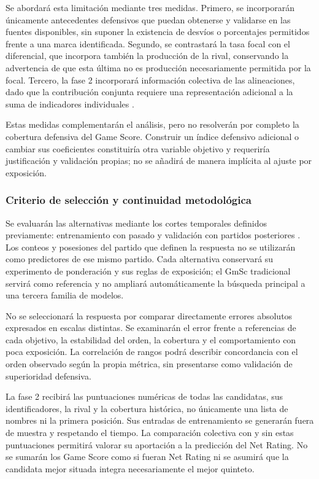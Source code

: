 Se abordará esta limitación mediante tres medidas. Primero, se incorporarán únicamente antecedentes defensivos que puedan obtenerse y validarse en las fuentes disponibles, sin suponer la existencia de desvíos o porcentajes permitidos frente a una marca identificada. Segundo, se contrastará la tasa focal con el diferencial, que incorpora también la producción de la rival, conservando la advertencia de que esta última no es producción necesariamente permitida por la focal. Tercero, la fase 2 incorporará información colectiva de las alineaciones, dado que la contribución conjunta requiere una representación adicional a la suma de indicadores individuales \cite{josephs2025hypergraphadjustedplusminus}.

Estas medidas complementarán el análisis, pero no resolverán por completo la cobertura defensiva del Game Score. Construir un índice defensivo adicional o cambiar sus coeficientes constituiría otra variable objetivo y requeriría justificación y validación propias; no se añadirá de manera implícita al ajuste por exposición.

\subsubsection*{Criterio de selección y continuidad metodológica}
Se evaluarán las alternativas mediante los cortes temporales definidos previamente: entrenamiento con pasado y validación con partidos posteriores \cite{sklearnTemporal613}. Los conteos y posesiones del partido que definen la respuesta no se utilizarán como predictores de ese mismo partido. Cada alternativa conservará su experimento de ponderación y sus reglas de exposición; el GmSc tradicional servirá como referencia y no ampliará automáticamente la búsqueda principal a una tercera familia de modelos.

No se seleccionará la respuesta por comparar directamente errores absolutos expresados en escalas distintas. Se examinarán el error frente a referencias de cada objetivo, la estabilidad del orden, la cobertura y el comportamiento con poca exposición. La correlación de rangos podrá describir concordancia con el orden observado según la propia métrica, sin presentarse como validación de superioridad defensiva.

La fase 2 recibirá las puntuaciones numéricas de todas las candidatas, sus identificadores, la rival y la cobertura histórica, no únicamente una lista de nombres ni la primera posición. Sus entradas de entrenamiento se generarán fuera de muestra y respetando el tiempo. La comparación colectiva con y sin estas puntuaciones permitirá valorar su aportación a la predicción del Net Rating. No se sumarán los Game Score como si fueran Net Rating ni se asumirá que la candidata mejor situada integra necesariamente el mejor quinteto.

